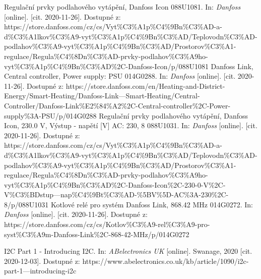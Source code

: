\begin{thebibliography}{3}
Regulační prvky podlahového vytápění, Danfoss Icon 088U1081. In: \textit{Danfoss} [online]. [cit. 2020-11-26]. Dostupné z: https://store.danfoss.com/cz/cs/Vyt\%C3\%A1p\%C4\%9Bn\%C3\%AD-a-d\%C3\%A1lkov\%C3\%A9-vyt\%C3\%A1p\%C4\%9Bn\%C3\%AD/Teplovodn\%C3\%AD-podlahov\%C3\%A9-vyt\%C3\%A1p\%C4\%9Bn\%C3\%AD/Prostorov\%C3\%A1-regulace/Regula\%C4\%8Dn\%C3\%AD-prvky-podlahov\%C3\%A9ho-vyt\%C3\%A1p\%C4\%9Bn\%C3\%AD\%2C-Danfoss-Icon/p/088U1081
Danfoss Link, Central controller, Power supply: PSU 014G0288. In: \textit{Danfoss} [online]. [cit. 2020-11-26]. Dostupné z: https://store.danfoss.com/en/Heating-and-District-Energy/Smart-Heating/Danfoss-Link---Smart-Heating/Central-Controller/Danfoss-Link\%E2\%84\%A2\%2C-Central-controller\%2C-Power-supply\%3A-PSU/p/014G0288
Regulační prvky podlahového vytápění, Danfoss Icon, 230.0 V, Výstup - napětí [V] AC: 230, 8 088U1031. In: \textit{Danfoss} [online]. [cit. 2020-11-26]. Dostupné z: https://store.danfoss.com/cz/cs/Vyt\%C3\%A1p\%C4\%9Bn\%C3\%AD-a-d\%C3\%A1lkov\%C3\%A9-vyt\%C3\%A1p\%C4\%9Bn\%C3\%AD/Teplovodn\%C3\%AD-podlahov\%C3\%A9-vyt\%C3\%A1p\%C4\%9Bn\%C3\%AD/Prostorov\%C3\%A1-regulace/Regula\%C4\%8Dn\%C3\%AD-prvky-podlahov\%C3\%A9ho-vyt\%C3\%A1p\%C4\%9Bn\%C3\%AD\%2C-Danfoss-Icon\%2C-230-0-V\%2C-V\%C3\%BDstup---nap\%C4\%9Bt\%C3\%AD-\%5BV\%5D-AC\%3A-230\%2C-8/p/088U1031
Kotlové relé pro systém Danfoss Link, 868.42 MHz 014G0272. In: \textit{Danfoss} [online]. [cit. 2020-11-26]. Dostupné z: https://store.danfoss.com/cz/cs/Kotlov\%C3\%A9-rel\%C3\%A9-pro-syst\%C3\%A9m-Danfoss-Link\%2C-868-42-MHz/p/014G0272

I2C Part 1 - Introducing I2C. In: \textit{ABelectronics UK} [online]. Swanage, 2020 [cit. 2020-12-03]. Dostupné z: https://www.abelectronics.co.uk/kb/article/1090/i2c-part-1---introducing-i2c







\end{thebibliography}